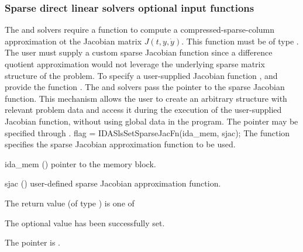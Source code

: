 {%
\subsubsection{Sparse direct linear solvers optional input functions}\label{sss:optin_sls}
The 
{\idaklu} and {\idasuperlumt} solvers require a function to compute a
compressed-sparse-column approximation ot the Jacobian matrix $J(t,y,\dot{y})$.  
This function must be of type . 
The user must supply a custom sparse Jacobian function since a
difference quotient approximation would not leverage the underlying
sparse matrix structure of the problem.  To specify a user-supplied
Jacobian function , {\idaklu} and {\idasuperlumt} provide
the function .  The {\idaklu} and
{\idasuperlumt} solvers pass the pointer  to the sparse
Jacobian function. This mechanism allows the user to create an arbitrary
structure with relevant problem data and access it during the
execution of the user-supplied Jacobian function, without using global
data in the program.  The pointer  may be specified
through .
{
  flag = IDASlsSetSparseJacFn(ida\_mem, sjac);
}
{
  The function  specifies the sparse Jacobian
  approximation function to be used.
}
{
  \begin{args}
  \item[ida\_mem] ()
    pointer to the {\idas} memory block.
  \item[sjac] ()
    user-defined sparse Jacobian approximation function.
  \end{args}
}
{
  The return value  (of type ) is one of
  \begin{args}
  \item[\Id{IDASLS\_SUCCESS}] 
    The optional value has been successfully set.
  \item[\Id{IDASLS\_MEM\_NULL}]
    The  pointer is .
  \item[\Id{IDASLS\_LMEM\_NULL}]

\end{args}}}

